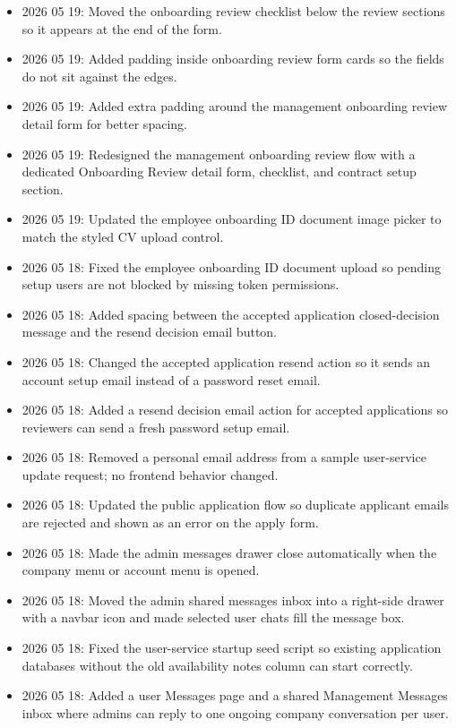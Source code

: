 \documentclass[11pt]{article}
\begin{document}
\begin{itemize}
    \item 2026 05 19: Moved the onboarding review checklist below the review sections so it appears at the end of the form.
    \item 2026 05 19: Added padding inside onboarding review form cards so the fields do not sit against the edges.
    \item 2026 05 19: Added extra padding around the management onboarding review detail form for better spacing.
    \item 2026 05 19: Redesigned the management onboarding review flow with a dedicated Onboarding Review detail form, checklist, and contract setup section.
    \item 2026 05 19: Updated the employee onboarding ID document image picker to match the styled CV upload control.
    \item 2026 05 18: Fixed the employee onboarding ID document upload so pending setup users are not blocked by missing token permissions.
    \item 2026 05 18: Added spacing between the accepted application closed-decision message and the resend decision email button.
    \item 2026 05 18: Changed the accepted application resend action so it sends an account setup email instead of a password reset email.
    \item 2026 05 18: Added a resend decision email action for accepted applications so reviewers can send a fresh password setup email.
    \item 2026 05 18: Removed a personal email address from a sample user-service update request; no frontend behavior changed.
    \item 2026 05 18: Updated the public application flow so duplicate applicant emails are rejected and shown as an error on the apply form.
    \item 2026 05 18: Made the admin messages drawer close automatically when the company menu or account menu is opened.
    \item 2026 05 18: Moved the admin shared messages inbox into a right-side drawer with a navbar icon and made selected user chats fill the message box.
    \item 2026 05 18: Fixed the user-service startup seed script so existing application databases without the old availability notes column can start correctly.
    \item 2026 05 18: Added a user Messages page and a shared Management Messages inbox where admins can reply to one ongoing company conversation per user.

\end{itemize}
\end{document}
